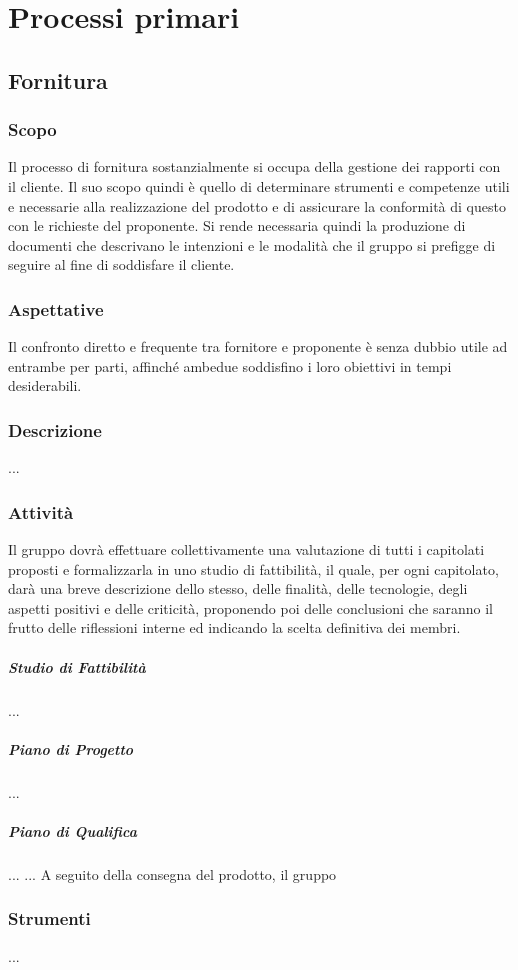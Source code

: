 \section{Processi primari}
\subsection{Fornitura}
    \subsubsection{Scopo}
        Il processo di fornitura sostanzialmente si occupa della gestione dei rapporti con il cliente.
        Il suo scopo quindi è quello di determinare strumenti e competenze utili e necessarie alla realizzazione del prodotto e di assicurare la conformità di questo con le richieste del proponente. Si rende necessaria quindi la produzione di documenti che descrivano le intenzioni e le modalità che il gruppo si prefigge di seguire al fine di soddisfare il cliente.
    \subsubsection{Aspettative}
        Il confronto diretto e frequente tra fornitore e proponente è senza dubbio utile ad entrambe per parti, affinché ambedue soddisfino i loro obiettivi in tempi desiderabili.
    \subsubsection{Descrizione}
        ...
    \subsubsection{Attività}
            Il gruppo dovrà effettuare collettivamente una valutazione di tutti i capitolati proposti e formalizzarla in uno studio di fattibilità, il quale, per ogni capitolato, darà una breve descrizione dello stesso, delle finalità, delle tecnologie, degli aspetti positivi e delle criticità, proponendo poi delle conclusioni che saranno il frutto delle riflessioni interne ed indicando la scelta definitiva dei membri.
            \subparagraph{Studio di Fattibilità}
                ...
            \subparagraph{Piano di Progetto}
                ...
            \subparagraph{Piano di Qualifica}
                ...
            ...
            A seguito della consegna del prodotto, il gruppo \group
    \subsubsection{Strumenti}
        ...

